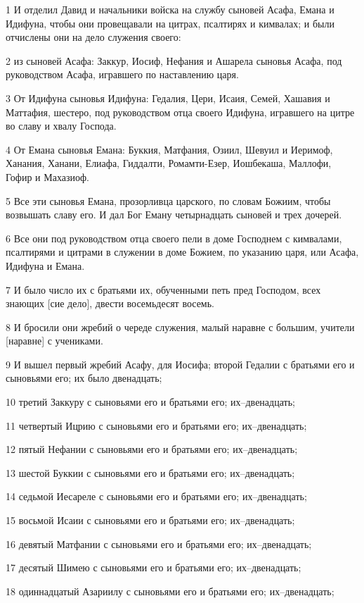 \par 1 И отделил Давид и начальники войска на службу сыновей Асафа, Емана и Идифуна, чтобы они провещавали на цитрах, псалтирях и кимвалах; и были отчислены они на дело служения своего:
\par 2 из сыновей Асафа: Заккур, Иосиф, Нефания и Ашарела сыновья Асафа, под руководством Асафа, игравшего по наставлению царя.
\par 3 От Идифуна сыновья Идифуна: Гедалия, Цери, Исаия, Семей, Хашавия и Маттафия, шестеро, под руководством отца своего Идифуна, игравшего на цитре во славу и хвалу Господа.
\par 4 От Емана сыновья Емана: Буккия, Матфания, Озиил, Шевуил и Иеримоф, Ханания, Ханани, Елиафа, Гиддалти, Ромамти-Езер, Иошбекаша, Маллофи, Гофир и Махазиоф.
\par 5 Все эти сыновья Емана, прозорливца царского, по словам Божиим, чтобы возвышать славу его. И дал Бог Еману четырнадцать сыновей и трех дочерей.
\par 6 Все они под руководством отца своего пели в доме Господнем с кимвалами, псалтирями и цитрами в служении в доме Божием, по указанию царя, или Асафа, Идифуна и Емана.
\par 7 И было число их с братьями их, обученными петь пред Господом, всех знающих [сие дело], двести восемьдесят восемь.
\par 8 И бросили они жребий о череде служения, малый наравне с большим, учители [наравне] с учениками.
\par 9 И вышел первый жребий Асафу, для Иосифа; второй Гедалии с братьями его и сыновьями его; их было двенадцать;
\par 10 третий Заккуру с сыновьями его и братьями его; их--двенадцать;
\par 11 четвертый Ицрию с сыновьями его и братьями его; их--двенадцать;
\par 12 пятый Нефании с сыновьями его и братьями его; их--двенадцать;
\par 13 шестой Буккии с сыновьями его и братьями его; их--двенадцать;
\par 14 седьмой Иесареле с сыновьями его и братьями его; их--двенадцать;
\par 15 восьмой Исаии с сыновьями его и братьями его; их--двенадцать;
\par 16 девятый Матфании с сыновьями его и братьями его; их--двенадцать;
\par 17 десятый Шимею с сыновьями его и братьями его; их--двенадцать;
\par 18 одиннадцатый Азариилу с сыновьями его и братьями его; их--двенадцать;
